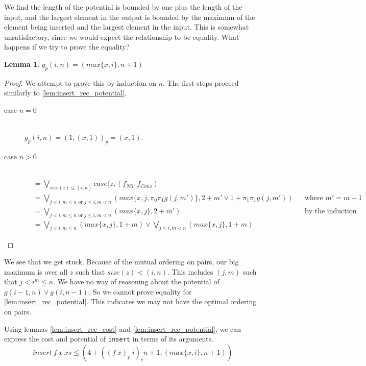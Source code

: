 \documentclass[12pt,letterpaper]{article}
\newtheorem{lemma}[theorem]{Lemma}
\newcommand{\T}[1]{\texttt{#1}}
\begin{document}
We find the length of the potential is bounded by one plus the length of the input,
  and the largest element in the output is bounded by the maximum of the element being inserted and the
  largest element in the input.
This is somewhat unsatisfactory, since we would expect the relationship to be equality.
What happens if we try to prove the equality?
\begin{lemma}
  \label{lem:insert_rec_potential_wrong}
  $g_p(i,n) = (max\{x, i\}, n+1)$
\end{lemma}
\begin{proof}
  We attempt to prove this by induction on $n$.
  The first steps proceed similarly to \ref{lem:insert_rec_potential}.
  \begin{description}
    \item[case $n=0$]\hfill \\
      $g_p(i,n) = (1, (x, 1))_p = (x, 1)$.
    \item[case $n>0$]\hfill \\
      \begin{align*}
        &= \bigvee_{size(z) \leq (i,n)} case(z, (f_{Nil}, f_{Cons}) &&\\
        &= \bigvee_{j < i, m \leq n \text{ or } j \leq i, m < n} (max\{x, j, \pi_0\pi_1g(j, m')\}, 2 + m' \vee 1 + \pi_1\pi_1g(j, m')) && \text{where $m' = m - 1$}\\
        &= \bigvee_{j < i, m \leq n \text{ or } j \leq i, m < n} (max\{x, j\}, 2 + m')&&\text{by the induction hypothesis}\\
        &= \bigvee_{j < i, m \leq n} (max\{x, j\}, 1 + m) \vee \bigvee_{j \leq i, m < n} (max\{x, j\}, 1 + m)&&
      \end{align*}
  \end{description}
\end{proof}

We see that we get stuck.
Because of the mutual ordering on pairs, our big maximum is over all $z$ such that $size(z) < (i, n)$.
This includes $(j, m)$ such that $j < i ^ m \leq n$.
We have no way of reasoning about the potential of $g(i-1, n) \vee g(i, n -1)$.
So we cannot prove equality for \ref{lem:insert_rec_potential}.
This indicates we may not have the optimal ordering on pairs.

Using lemmas \ref{lem:insert_rec_cost} and \ref{lem:insert_rec_potential}, we can express the cost and potential of \T{insert} in terms of its arguments.
\begin{equation}
  \label{eq:insert_interp}
  insert\ f\ x\ xs \leq (4 + ((f\ x)_p\ i)_c n + 1, (max\{x, i\}, n+1))
\end{equation}
\end{document}

